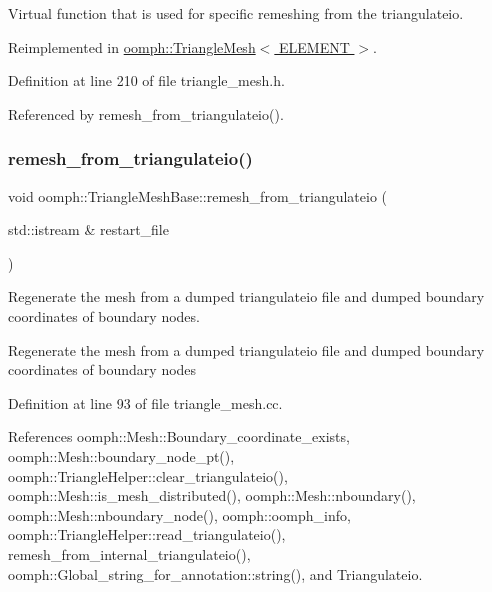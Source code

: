 Virtual function that is used for specific remeshing from the triangulateio. 



Reimplemented in \hyperlink{classoomph_1_1TriangleMesh_a9bc95b0f26f8cd352997d2db32a6a292}{oomph\+::\+Triangle\+Mesh$<$ E\+L\+E\+M\+E\+N\+T $>$}.



Definition at line 210 of file triangle\+\_\+mesh.\+h.



Referenced by remesh\+\_\+from\+\_\+triangulateio().

\mbox{\label{classoomph_1_1TriangleMeshBase_a8e8d7354b213cba989b661f0b748d8b5}} 
\subsubsection{\texorpdfstring{remesh\+\_\+from\+\_\+triangulateio()}{remesh\_from\_triangulateio()}}
{\footnotesize\ttfamily void oomph\+::\+Triangle\+Mesh\+Base\+::remesh\+\_\+from\+\_\+triangulateio (\begin{DoxyParamCaption}\item[{std\+::istream \&}]{restart\+\_\+file }\end{DoxyParamCaption})}



Regenerate the mesh from a dumped triangulateio file and dumped boundary coordinates of boundary nodes. 

Regenerate the mesh from a dumped triangulateio file and dumped boundary coordinates of boundary nodes 

Definition at line 93 of file triangle\+\_\+mesh.\+cc.



References oomph\+::\+Mesh\+::\+Boundary\+\_\+coordinate\+\_\+exists, oomph\+::\+Mesh\+::boundary\+\_\+node\+\_\+pt(), oomph\+::\+Triangle\+Helper\+::clear\+\_\+triangulateio(), oomph\+::\+Mesh\+::is\+\_\+mesh\+\_\+distributed(), oomph\+::\+Mesh\+::nboundary(), oomph\+::\+Mesh\+::nboundary\+\_\+node(), oomph\+::oomph\+\_\+info, oomph\+::\+Triangle\+Helper\+::read\+\_\+triangulateio(), remesh\+\_\+from\+\_\+internal\+\_\+triangulateio(), oomph\+::\+Global\+\_\+string\+\_\+for\+\_\+annotation\+::string(), and Triangulateio.



